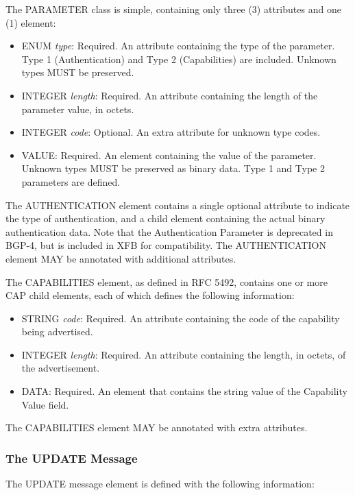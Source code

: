 \documentclass{article}
\begin{document}
The PARAMETER class is simple, containing only three (3) attributes and one (1) element:

\begin{itemize}
\item{ENUM \emph{type}: Required. An attribute containing the type of the parameter.  Type 1 (Authentication) and Type 2 (Capabilities) are included.  Unknown types MUST be preserved.}
\item{INTEGER \emph{length}: Required. An attribute containing the length of the parameter value, in octets.}
\item{INTEGER \emph{code}: Optional. An extra attribute for unknown type codes.}
\item{VALUE: Required. An element containing the value of the parameter. Unknown types MUST be preserved as binary data. Type 1 and Type 2 parameters are defined.}
\end{itemize}

The AUTHENTICATION element contains a single optional attribute to indicate the type of authentication, and a child element containing the actual binary authentication data.  Note that the Authentication Parameter is deprecated in BGP-4, but is included in XFB for compatibility.  The AUTHENTICATION element MAY be annotated with additional attributes.

The CAPABILITIES element, as defined in RFC 5492, contains one or more CAP child elements, each of which defines the following information:

\begin{itemize}
\item{STRING \emph{code}: Required. An attribute containing the code of the capability being advertised.}
\item{INTEGER \emph{length}: Required. An attribute containing the length, in octets, of the advertisement.}
\item{DATA: Required. An element that contains the string value of the Capability Value field.}
\end{itemize}

The CAPABILITIES element MAY be annotated with extra attributes.

\subsubsection{The UPDATE Message}
\label{UPDATE}
The UPDATE message element is defined with the following information:
\end{document}
